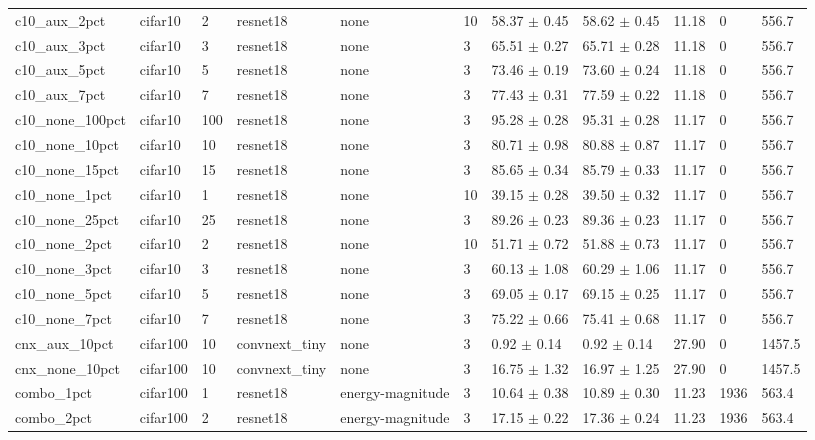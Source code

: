 \begin{tabular}{lllllllllll}
c10_aux_2pct & cifar10 & 2 & resnet18 & none & 10 & 58.37 $\pm$ 0.45 & 58.62 $\pm$ 0.45 & 11.18 & 0 & 556.7 \\
c10_aux_3pct & cifar10 & 3 & resnet18 & none & 3 & 65.51 $\pm$ 0.27 & 65.71 $\pm$ 0.28 & 11.18 & 0 & 556.7 \\
c10_aux_5pct & cifar10 & 5 & resnet18 & none & 3 & 73.46 $\pm$ 0.19 & 73.60 $\pm$ 0.24 & 11.18 & 0 & 556.7 \\
c10_aux_7pct & cifar10 & 7 & resnet18 & none & 3 & 77.43 $\pm$ 0.31 & 77.59 $\pm$ 0.22 & 11.18 & 0 & 556.7 \\
c10_none_100pct & cifar10 & 100 & resnet18 & none & 3 & 95.28 $\pm$ 0.28 & 95.31 $\pm$ 0.28 & 11.17 & 0 & 556.7 \\
c10_none_10pct & cifar10 & 10 & resnet18 & none & 3 & 80.71 $\pm$ 0.98 & 80.88 $\pm$ 0.87 & 11.17 & 0 & 556.7 \\
c10_none_15pct & cifar10 & 15 & resnet18 & none & 3 & 85.65 $\pm$ 0.34 & 85.79 $\pm$ 0.33 & 11.17 & 0 & 556.7 \\
c10_none_1pct & cifar10 & 1 & resnet18 & none & 10 & 39.15 $\pm$ 0.28 & 39.50 $\pm$ 0.32 & 11.17 & 0 & 556.7 \\
c10_none_25pct & cifar10 & 25 & resnet18 & none & 3 & 89.26 $\pm$ 0.23 & 89.36 $\pm$ 0.23 & 11.17 & 0 & 556.7 \\
c10_none_2pct & cifar10 & 2 & resnet18 & none & 10 & 51.71 $\pm$ 0.72 & 51.88 $\pm$ 0.73 & 11.17 & 0 & 556.7 \\
c10_none_3pct & cifar10 & 3 & resnet18 & none & 3 & 60.13 $\pm$ 1.08 & 60.29 $\pm$ 1.06 & 11.17 & 0 & 556.7 \\
c10_none_5pct & cifar10 & 5 & resnet18 & none & 3 & 69.05 $\pm$ 0.17 & 69.15 $\pm$ 0.25 & 11.17 & 0 & 556.7 \\
c10_none_7pct & cifar10 & 7 & resnet18 & none & 3 & 75.22 $\pm$ 0.66 & 75.41 $\pm$ 0.68 & 11.17 & 0 & 556.7 \\
cnx_aux_10pct & cifar100 & 10 & convnext_tiny & none & 3 & 0.92 $\pm$ 0.14 & 0.92 $\pm$ 0.14 & 27.90 & 0 & 1457.5 \\
cnx_none_10pct & cifar100 & 10 & convnext_tiny & none & 3 & 16.75 $\pm$ 1.32 & 16.97 $\pm$ 1.25 & 27.90 & 0 & 1457.5 \\
combo_1pct & cifar100 & 1 & resnet18 & energy-magnitude & 3 & 10.64 $\pm$ 0.38 & 10.89 $\pm$ 0.30 & 11.23 & 1936 & 563.4 \\
combo_2pct & cifar100 & 2 & resnet18 & energy-magnitude & 3 & 17.15 $\pm$ 0.22 & 17.36 $\pm$ 0.24 & 11.23 & 1936 & 563.4 \\

\end{tabular}
